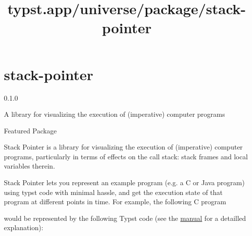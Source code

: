 \title{typst.app/universe/package/stack-pointer}

\label{banner}
\section{stack-pointer}\label{stack-pointer}

{ 0.1.0 }

A library for visualizing the execution of (imperative) computer
programs

{ } Featured Package

\label{readme}
Stack Pointer is a library for visualizing the execution of (imperative)
computer programs, particularly in terms of effects on the call stack:
stack frames and local variables therein.

Stack Pointer lets you represent an example program (e.g. a C or Java
program) using typst code with minimal hassle, and get the execution
state of that program at different points in time. For example, the
following C program

\begin{Shaded}
\begin{Highlighting}[]
\OperatorTok{()} \OperatorTok{\{}
  \OperatorTok{=}\OperatorTok{();}
   \OperatorTok{;}
\OperatorTok{\}}

\OperatorTok{()} \OperatorTok{\{}
   \OperatorTok{;}
\OperatorTok{\}}
\end{Highlighting}
\end{Shaded}

would be represented by the following Typst code (see the
\href{https://github.com/typst/packages/raw/main/packages/preview/stack-pointer/0.1.0/docs/manual.pdf}{manual}
for a detailled explanation):

\begin{Shaded}
\begin{Highlighting}[]
\NormalTok{  \})}
\NormalTok{  \})}
\NormalTok{\})}
\end{Highlighting}
\end{Shaded}

